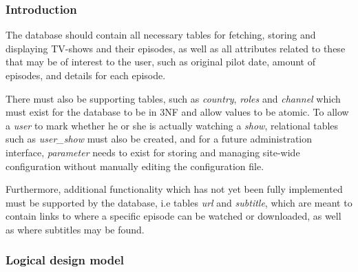 \subsubsection{Introduction}
The database should contain all necessary tables for fetching, storing and displaying TV-shows and their episodes, as well as all attributes related to these that may be of interest to the user, such as original pilot date, amount of episodes, and details for each episode. 

There must also be supporting tables, such as \textit{country}, \textit{roles} and \textit{channel} which must exist for the database to be in 3NF and allow values to be atomic. To allow a \textit{user} to mark whether he or she is actually watching a \textit{show}, relational tables such as \textit{user\_show} must also be created, and for a future administration interface, \textit{parameter} needs to exist for storing and managing site-wide configuration without manually editing the configuration file.

Furthermore, additional functionality which has not yet been fully implemented must be supported by the database, i.e tables \textit{url} and \textit{subtitle}, which are meant to contain links to where a specific episode can be watched or downloaded, as well as where subtitles may be found. 

\subsubsection{Logical design model}

